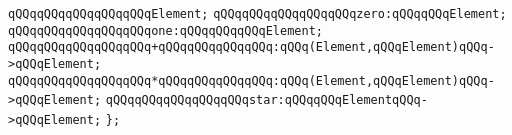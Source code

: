 \newline
\verb|qQQqqQQqqQQqqQQqqQQqElement;|\newline
\newline
\verb|qQQqqQQqqQQqqQQqqQQqzero:qQQqqQQqElement;|\newline
\verb|qQQqqQQqqQQqqQQqqQQqone:qQQqqQQqqQQqElement;|\newline
\verb|qQQqqQQqqQQqqQQqqQQq+qQQqqQQqqQQqqQQq:qQQq(Element,qQQqElement)qQQq->qQQqElement;|\newline
\verb|qQQqqQQqqQQqqQQqqQQq*qQQqqQQqqQQqqQQq:qQQq(Element,qQQqElement)qQQq->qQQqElement;|\newline
\verb|qQQqqQQqqQQqqQQqqQQqstar:qQQqqQQqElementqQQq->qQQqElement;|\newline
\newline
\verb|};|\newline
\newline

